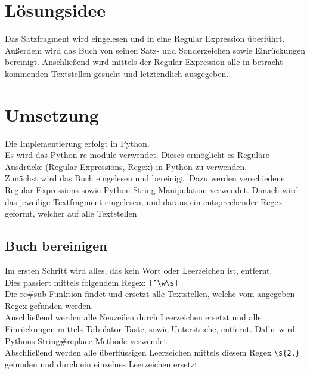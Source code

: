 \maketitle
\tableofcontents

\vspace{0.5cm}


\section{Lösungsidee}\label{sec:losungsidee}
Das Satzfragment wird eingelesen und in eine Regular Expression überführt.
Außerdem wird das Buch von seinen Satz- und Sonderzeichen sowie Einrückungen bereinigt.
Anschließend wird mittels der Regular Expression alle in betracht kommenden Textstellen gesucht
und letztendlich ausgegeben.


\section{Umsetzung}\label{sec:umsetzung}
Die Implementierung erfolgt in Python. \\
Es wird das Python re module verwendet.
Dieses ermöglicht es Reguläre Ausdrücke (Regular Expressions, Regex) in Python zu verwenden. \\
Zunächst wird das Buch eingelesen und bereinigt.
Dazu werden verschiedene Regular Expressions sowie Python String Manipulation verwendet.
Danach wird das jeweilige Textfragment eingelesen, und daraus ein entsprechender Regex geformt, welcher
auf alle Textstellen

\subsection{Buch bereinigen}\label{subsec:buch-bereinigen}
Im ersten Schritt wird alles, das kein Wort oder Leerzeichen ist, entfernt. \\
Dies passiert mittels folgendem Regex: \verb/[^\w\s]/ \\
Die re\#sub Funktion findet und ersetzt alle Textstellen, welche vom angegeben Regex gefunden werden. \\
Anschließend werden alle Neuzeilen durch Leerzeichen ersetzt und
alle Einrückungen mittels Tabulator-Taste, sowie Unterstriche, entfernt.
Dafür wird Pythons String\#replace Methode verwendet.\\
Abschließend werden alle überflüssigen Leerzeichen mittels diesem Regex \verb/\s{2,}/ gefunden
und durch ein einzelnes Leerzeichen ersetzt.

